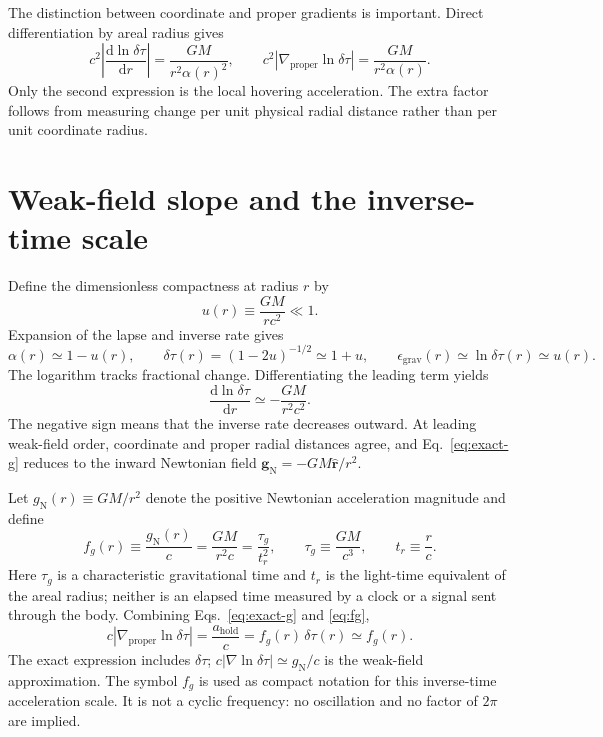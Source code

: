 \documentclass[12pt]{article}
\begin{document}
The distinction between coordinate and proper gradients is important. Direct differentiation by areal radius gives
\begin{equation}
  c^2\left|\frac{\mathrm{d}\ln\delta\tau}{\mathrm{d}r}\right|
  =\frac{GM}{r^2\alpha(r)^2},
  \qquad
  c^2\left|\nabla_{\mathrm{proper}}\ln\delta\tau\right|
  =\frac{GM}{r^2\alpha(r)}.
  \label{eq:coordinate-v-proper}
\end{equation}
Only the second expression is the local hovering acceleration. The extra factor follows from measuring change per unit physical radial distance rather than per unit coordinate radius.

\section{Weak-field slope and the inverse-time scale}

Define the dimensionless compactness at radius $r$ by
\begin{equation}
  u(r)\equiv\frac{GM}{rc^2}\ll1.
  \label{eq:compactness}
\end{equation}
Expansion of the lapse and inverse rate gives
\begin{equation}
  \alpha(r)\simeq1-u(r),
  \qquad
  \delta\tau(r)=(1-2u)^{-1/2}\simeq1+u,
  \qquad
  \epsilon_{\mathrm{grav}}(r)\simeq\ln\delta\tau(r)\simeq u(r).
  \label{eq:weak-rate}
\end{equation}
The logarithm tracks fractional change. Differentiating the leading term yields
\begin{equation}
  \frac{\mathrm{d}\ln\delta\tau}{\mathrm{d}r}
  \simeq-\frac{GM}{r^2c^2}.
  \label{eq:coordinate-slope}
\end{equation}
The negative sign means that the inverse rate decreases outward. At leading weak-field order, coordinate and proper radial distances agree, and Eq.~\eqref{eq:exact-g} reduces to the inward Newtonian field $\mathbf{g}_{\mathrm{N}}=-GM\hat{\mathbf r}/r^2$.

Let $g_{\mathrm{N}}(r)\equiv GM/r^2$ denote the positive Newtonian acceleration magnitude and define
\begin{equation}
  f_g(r)\equiv\frac{g_{\mathrm{N}}(r)}{c}
  =\frac{GM}{r^2c}
  =\frac{\tau_g}{t_r^2},
  \qquad
  \tau_g\equiv\frac{GM}{c^3},
  \qquad
  t_r\equiv\frac{r}{c}.
  \label{eq:fg}
\end{equation}
Here $\tau_g$ is a characteristic gravitational time and $t_r$ is the light-time equivalent of the areal radius; neither is an elapsed time measured by a clock or a signal sent through the body. Combining Eqs.~\eqref{eq:exact-g} and \eqref{eq:fg},
\begin{equation}
  c\left|\nabla_{\mathrm{proper}}\ln\delta\tau\right|
  =\frac{a_{\mathrm{hold}}}{c}
  =f_g(r)\,\delta\tau(r)
  \simeq f_g(r).
  \label{eq:fg-gradient}
\end{equation}
The exact expression includes $\delta\tau$; $c|\nabla\ln\delta\tau|\simeq g_{\mathrm{N}}/c$ is the weak-field approximation. The symbol $f_g$ is used as compact notation for this inverse-time acceleration scale. It is not a cyclic frequency: no oscillation and no factor of $2\pi$ are implied.
\end{document}
